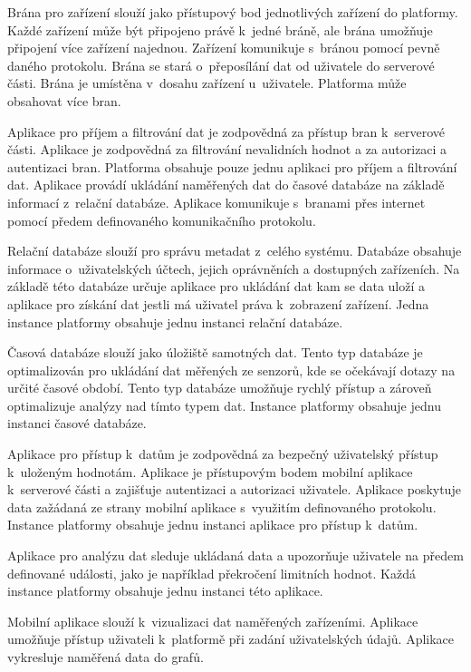 Brána pro zařízení slouží jako přístupový bod jednotlivých zařízení do platformy. Každé zařízení může být připojeno právě k~jedné bráně, ale brána umožňuje připojení více zařízení najednou. Zařízení komunikuje s~bránou pomocí pevně daného protokolu. Brána se stará o~přeposílání dat od uživatele do serverové části. Brána je umístěna v~dosahu zařízení u~uživatele. Platforma může obsahovat více bran.

Aplikace pro příjem a filtrování dat je zodpovědná za přístup bran k~serverové části. Aplikace je zodpovědná za filtrování nevalidních hodnot a za autorizaci a autentizaci bran. Platforma obsahuje pouze jednu aplikaci pro příjem a filtrování dat. Aplikace provádí ukládání naměřených dat do časové databáze na základě informací z~relační databáze. Aplikace komunikuje s~branami přes internet pomocí předem definovaného komunikačního protokolu.

Relační databáze slouží pro správu metadat z~celého systému. Databáze obsahuje informace o~uživatelských účtech, jejich oprávněních a dostupných zařízeních. Na základě této databáze určuje aplikace pro ukládání dat kam se data uloží a aplikace pro získání dat jestli má uživatel práva k~zobrazení zařízení. Jedna instance platformy obsahuje jednu instanci relační databáze.

Časová databáze slouží jako úložiště samotných dat. Tento typ databáze je optimalizován pro ukládání dat měřených ze senzorů, kde se očekávají dotazy na určité časové období. Tento typ databáze umožňuje rychlý přístup a zároveň optimalizuje analýzy nad tímto typem dat. Instance platformy obsahuje jednu instanci časové databáze.

Aplikace pro přístup k~datům je zodpovědná za bezpečný uživatelský přístup k~uloženým hodnotám. Aplikace je přístupovým bodem mobilní aplikace k~serverové části a zajišťuje autentizaci a autorizaci uživatele. Aplikace poskytuje data zažádaná ze strany mobilní aplikace s~využitím definovaného protokolu. Instance platformy obsahuje jednu instanci aplikace pro přístup k~datům.

Aplikace pro analýzu dat sleduje ukládaná data a upozorňuje uživatele na předem definované události, jako je například překročení limitních hodnot. Každá instance platformy obsahuje jednu instanci této aplikace.

Mobilní aplikace slouží k~vizualizaci dat naměřených zařízeními. Aplikace umožňuje přístup uživateli k~platformě při zadání uživatelských údajů. Aplikace vykresluje naměřená data do grafů.

